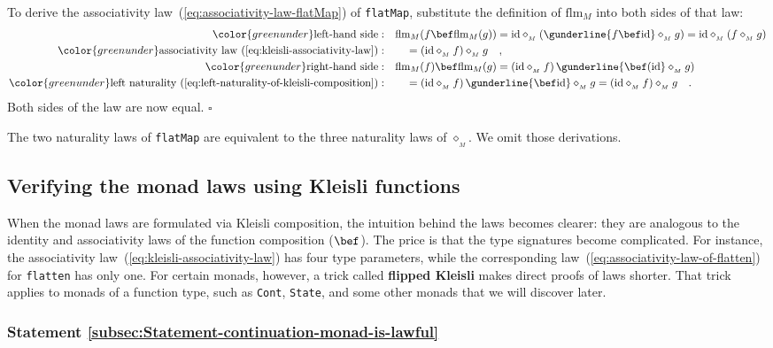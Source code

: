 To derive the associativity law~(\ref{eq:associativity-law-flatMap})
of \lstinline!flatMap!, substitute the definition of $\text{flm}_{M}$
into both sides of that law:
\begin{align*}
{\color{greenunder}\text{left-hand side}:}\quad & \text{flm}_{M}(f\bef\text{flm}_{M}(g))=\text{id}\diamond_{_{M}}(\gunderline{f\bef\text{id}}\diamond_{_{M}}g)=\text{id}\diamond_{_{M}}(f\diamond_{_{M}}g)\\
{\color{greenunder}\text{associativity law~(\ref{eq:kleisli-associativity-law})}:}\quad & \quad=(\text{id}\diamond_{_{M}}f)\diamond_{_{M}}g\quad,\\
{\color{greenunder}\text{right-hand side}:}\quad & \text{flm}_{M}(f)\bef\text{flm}_{M}(g)=(\text{id}\diamond_{_{M}}f)\,\gunderline{\bef(\text{id}}\diamond_{_{M}}g)\\
{\color{greenunder}\text{left naturality~(\ref{eq:left-naturality-of-kleisli-composition})}:}\quad & \quad=(\text{id}\diamond_{_{M}}f)\,\gunderline{\bef\text{id}}\diamond_{_{M}}g=(\text{id}\diamond_{_{M}}f)\diamond_{_{M}}g\quad.
\end{align*}
Both sides of the law are now equal. $\square$

The two naturality laws of \lstinline!flatMap! are equivalent to
the three naturality laws of $\diamond_{_{M}}$. We omit those derivations. 

\subsection{Verifying the monad laws using Kleisli functions\label{subsec:Verifying-the-monad-via-Kleisli-trick}}

When the monad laws are formulated via Kleisli composition, the intuition
behind the laws becomes clearer: they are analogous to the identity
and associativity laws of the function composition ($\bef$). The
price is that the type signatures become complicated. For instance,
the associativity law~(\ref{eq:kleisli-associativity-law}) has four
type parameters, while the corresponding law~(\ref{eq:associativity-law-of-flatten})
for \lstinline!flatten! has only one. For certain monads, however,
a trick called \textbf{flipped
Kleisli} makes direct proofs of laws shorter. That trick applies to
monads of a function type, such as \lstinline!Cont!, \lstinline!State!,
and some other monads that we will discover later.

\subsubsection{Statement \label{subsec:Statement-continuation-monad-is-lawful}\ref{subsec:Statement-continuation-monad-is-lawful}}

